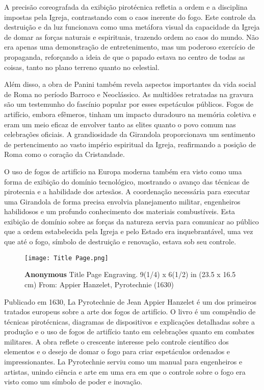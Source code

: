 A precisão coreografada da exibição pirotécnica refletia a ordem e a disciplina impostas pela Igreja, contrastando com o caos inerente do fogo. Este controle da destruição e da luz funcionava como uma metáfora visual da capacidade da Igreja de domar as forças naturais e espirituais, trazendo ordem ao caos do mundo. Não era apenas uma demonstração de entretenimento, mas um poderoso exercício de propaganda, reforçando a ideia de que o papado estava no centro de todas as coisas, tanto no plano terreno quanto no celestial.

Além disso, a obra de Panini também revela aspectos importantes da vida social de Roma no período Barroco e Neoclássico. As multidões retratadas na gravura são um testemunho do fascínio popular por esses espetáculos públicos. Fogos de artifício, embora efêmeros, tinham um impacto duradouro na memória coletiva e eram um meio eficaz de envolver tanto as elites quanto o povo comum nas celebrações oficiais. A grandiosidade da Girandola proporcionava um sentimento de pertencimento ao vasto império espiritual da Igreja, reafirmando a posição de Roma como o coração da Cristandade.

O uso de fogos de artifício na Europa moderna também era visto como uma forma de exibição do domínio tecnológico, mostrando o avanço das técnicas de pirotecnia e a habilidade dos artesãos. A coordenação necessária para executar uma Girandola de forma precisa envolvia planejamento militar, engenheiros habilidosos e um profundo conhecimento dos materiais combustíveis. Esta exibição de domínio sobre as forças da natureza servia para comunicar ao público que a ordem estabelecida pela Igreja e pelo Estado era inquebrantável, uma vez que até o fogo, símbolo de destruição e renovação, estava sob seu controle.

\begin{wrapfigure}{r}{0.4\textwidth} %
    \centering
    \texttt{[image: Title Page.png]}
    \caption{\fontsize{8}{8}\selectfont \textbf{Anonymous} Title Page Engraving. 9(1/4) x 6(1/2) in (23.5 x 16.5 cm) From: Appier Hanzelet, Pyrotechnie (1630) }
\end{wrapfigure}

Publicado em 1630, La Pyrotechnie de Jean Appier Hanzelet é um dos primeiros tratados europeus sobre a arte dos fogos de artifício. O livro é um compêndio de técnicas pirotécnicas, diagramas de dispositivos e explicações detalhadas sobre a produção e o uso de fogos de artifício tanto em celebrações quanto em combates militares. A obra reflete o crescente interesse pelo controle científico dos elementos e o desejo de domar o fogo para criar espetáculos ordenados e impressionantes. La Pyrotechnie serviu como um manual para engenheiros e artistas, unindo ciência e arte em uma era em que o controle sobre o fogo era visto como um símbolo de poder e inovação.

